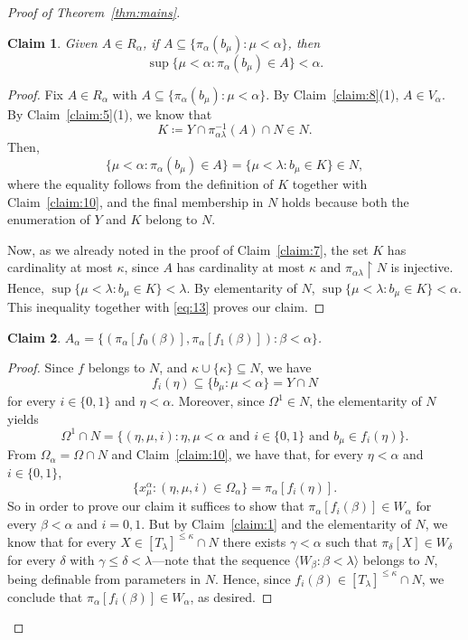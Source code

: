 \documentclass[]{amsart}
\newtheorem{claim}{Claim}[theorem]
\theoremstyle{definition}
\theoremstyle{remark}
\begin{document}
\begin{proof}[Proof of Theorem~\ref{thm:mains}]
\begin{claim}\label{claim:12}
Given $A \in R_\alpha$, if $A \subseteq \{\pi_\alpha(b_\mu) : \mu < \alpha\}$, then 
\[
\sup \{\mu < \alpha : \pi_\alpha(b_\mu) \in A\} < \alpha.
\]
\end{claim}
\begin{proof}
Fix $A \in R_\alpha$ with $A \subseteq \{\pi_\alpha(b_\mu) : \mu < \alpha\}$. By Claim~\ref{claim:8}(1), $A \in V_\alpha$.  By Claim~\ref{claim:5}(1), we know that 
\[
K \coloneqq Y \cap \pi_{\alpha \lambda}^{-1}(A) \cap N \in N.
\]
Then,
\begin{equation}\label{eq:13}
\{\mu < \alpha : \pi_\alpha(b_\mu) \in A\} = \{\mu < \lambda : b_\mu \in K\} \in N,
\end{equation}
where the equality follows from the definition of $K$ together with Claim~\ref{claim:10}, and the final membership in $N$ holds because both the enumeration of $Y$ and $K$ belong to $N$. 

Now, as we already noted in the proof of Claim~\ref{claim:7}, the set $K$ has cardinality at most $\kappa$, since $A$ has cardinality at most $\kappa$ and $\pi_{\alpha \lambda} \upharpoonright N$ is injective. Hence, $ \sup \{\mu < \lambda : b_\mu \in K\} < \lambda$. By elementarity of $N$, $ \sup \{\mu < \lambda : b_\mu \in K\} < \alpha$. This inequality together with \eqref{eq:13} proves our claim.
\end{proof}


\begin{claim}\label{claim:13}
$A_\alpha = \{(\pi_\alpha[f_0(\beta)], \pi_\alpha[f_1(\beta)]) : \beta < \alpha\}$.
\end{claim}
\begin{proof}
Since $f$ belongs to $N$, and $\kappa \cup \{\kappa\} \subseteq N$, we have
\[
f_i(\eta) \subseteq \{b_\mu : \mu < \alpha\} = Y \cap N
\]
 for every $i\in\{0,1\}$ and $\eta < \alpha$. Moreover, since $\Omega^1 \in N$, the elementarity of $N$ yields
\[
\Omega^1 \cap N = \{(\eta, \mu, i) : \eta, \mu < \alpha \text{ and } i\in \{0,1\} \text{ and } b_\mu \in f_i(\eta)  \}.
\]
From $\Omega_\alpha = \Omega \cap N$ and Claim~\ref{claim:10}, we have that, for every $\eta < \alpha$ and $i \in \{0,1\}$, 
\[
\{x^\alpha_\mu : (\eta, \mu, i) \in \Omega_\alpha\} = \pi_\alpha[f_i(\eta)].
\]
So in order to prove our claim it suffices to show that $\pi_\alpha[f_i(\beta)] \in W_\alpha$ for every $\beta < \alpha$ and $i = 0,1$. But by Claim~\ref{claim:1} and the elementarity of $N$, we know that for every $X \in [T_{\lambda}]^{\le\kappa} \cap N$ there exists $\gamma < \alpha$ such that $\pi_\delta[X] \in W_\delta$ for every $\delta$ with $\gamma \le \delta < \lambda$---note that the sequence $\langle W_\beta : \beta < \lambda\rangle$ belongs to $N$, being definable from parameters in $N$.  Hence, since $f_i(\beta) \in [T_{\lambda}]^{\le\kappa} \cap N$, we conclude that $\pi_\alpha[f_i(\beta)] \in W_\alpha$, as desired.
\end{proof}



\end{proof}
\end{document}
